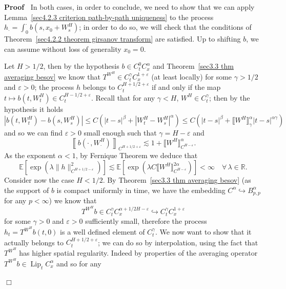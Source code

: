 \documentclass[10pt]{article}
\newcommand{\tmop}[1]{\ensuremath{\operatorname{#1}}}
\newenvironment{proof}{\noindent\textbf{Proof\ }}{\hspace*{\fill}$\Box$\medskip}
\begin{document}
\begin{proof}
  In both cases, in order to conclude, we need to show that we can apply
  Lemma~\ref{sec4.2.3 criterion path-by-path uniqueness} to the process
  $h_{\cdot} = \int_0^{\cdot} b (s, x_0 + W^H_s)$; in order to do so, we will
  check that the conditions of Theorem~\ref{sec4.2.2 theorem girsanov
  transform} are satisfied. Up to shifting $b$, we can assume without loss of
  generality $x_0 = 0$.
  
  Let $H > 1 / 2$, then by the hypothesis $b \in C^0_t C^{\alpha}_x$ and
  Theorem~\ref{sec3.3 thm averaging besov} we know that $T^{W^H} \in
  C^{\gamma}_t C^{1 + \varepsilon}_x$ (at least locally) for some $\gamma > 1
  / 2$ and $\varepsilon > 0$; the process $h$ belongs to $C_t^{H + 1 / 2 +
  \varepsilon}$ if and only if the map $t \mapsto b (t, W^H_t) \in C_t^{H - 1
  / 2 + \varepsilon}$. Recall that for any $\gamma < H$, $W^H \in
  C_t^{\gamma}$; then by the hypothesis it holds
  \[ | b (t, W^H_t) - b (s, W^H_s) | \leqslant C (| t - s |^{\beta} + | W^H_t
     - W^H_s |^{\alpha}) \leqslant C (| t - s |^{\beta} + \llbracket W^H
     \rrbracket^{\alpha}_{\gamma} | t - s |^{\alpha \gamma}) \]
  and so we can find $\varepsilon > 0$ small enough such that $\gamma = H -
  \varepsilon$ and
  \[ \left\llbracket b \left( \cdot \,, W^H_{\cdot} \right)
     \right\rrbracket_{C^{H + 1 / 2 + \varepsilon}} \lesssim 1 + \llbracket
     W^H \rrbracket^{\alpha}_{C^{H - \varepsilon}} . \]
  As the exponent $\alpha < 1$, by Fernique Theorem we deduce that
  \[ \mathbb{E} [\exp (\lambda \| h \|_{C^{H + 1 / 2 - \varepsilon}}^2)]
     \lesssim \mathbb{E} [\exp (\lambda C \llbracket W^H \rrbracket_{C^{H -
     \varepsilon}}^{2 \alpha})] < \infty \quad \forall \, \lambda \in
     \mathbb{R}. \]
  Consider now the case $H < 1 / 2$. By Theorem~\ref{sec3.3 thm averaging
  besov} (as the support of $b$ is compact uniformly in time, we have the
  embedding $C^{\alpha} \hookrightarrow B^{\alpha}_{p, p}$ for any $p <
  \infty$) we know that
  \[ T^{W^H} b \in C^{\gamma}_t C^{\alpha + 1 / 2 H - \varepsilon}_x
     \hookrightarrow C^{\gamma}_t C^{1 + \varepsilon}_x \]
  for some $\gamma > 0$ and $\varepsilon > 0$ sufficiently small, therefore
  the process $h_t = T^{W^H} b (t, 0)$ is a well defined element of
  $C^{\gamma}_t$. We now want to show that it actually belongs to $C_t^{H + 1
  / 2 + \varepsilon}$; \quad we can do so by interpolation, using the fact
  that $T^{W^H}$ has higher spatial regularity. Indeed by properties of the
  averaging operator $T^{W^H} b \in \tmop{Lip}_t C^{\alpha}_x$ and so for any

\end{proof}
\end{document}

